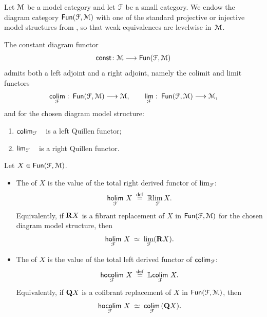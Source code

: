 \begin{definition}\label{ch2:: def: homotopy-(co)limits}
  Let $\mathcal M$ be a model category and let $\mathcal F$ be a small category.
  We endow the diagram category $\operatorname{{\sf Fun}}(\mathcal F,\mathcal M)$ with one of the standard
  projective or injective model structures from
  , so that weak equivalences are
  levelwise in~$\mathcal M$.

  The constant diagram functor
  \begin{equation}
    \operatorname{\sf const} \colon \mathcal M \longrightarrow \operatorname{{\sf Fun}}(\mathcal F,\mathcal M)
  \end{equation}
  admits both a left adjoint and a right adjoint, namely the colimit and
  limit functors
  \begin{equation}
    \Colimit[\cF] \colon \Fun(\cF,\cM) \longra \cM,
    \qquad
    \Limit[\cF] \colon \Fun(\cF,\cM) \longra \cM,
  \end{equation}
  and for the chosen diagram model structure:
  \begin{enumerate}
    \item $\Colimit[\cF]$ is a left Quillen functor;
    \item $\Limit[\cF]$ is a right Quillen functor.
  \end{enumerate}

  Let $X \in \operatorname{{\sf Fun}}(\mathcal F,\mathcal M)$.
  \begin{itemize}
    \item The  of $X$ is the value of the total
      right derived functor of $\lim_{\mathcal F}$:
      \begin{equation}
        \hoLimit[\cF] X
        \;\overset{\mathsf{def}}{=}\;
        \RR\!\lim_{\cF} X.
      \end{equation}
      Equivalently, if $\mathbf R X$ is a fibrant replacement of $X$
      in $\operatorname{{\sf Fun}}(\mathcal F,\mathcal M)$ for the chosen diagram model structure, then
      \begin{equation}
        \hoLimit[\cF] X
        \;\simeq\;
        \lim_{\cF} (\bR X).
      \end{equation}
    \item The  of $X$ is the value of the total
      left derived functor of $\operatorname{{\sf colim}}_{\mathcal F}$:
      \begin{equation}
        \hoColimit[\cF] X
        \;\overset{\mathsf{def}}{=}\;
        \LL\!\Colimit[\cF] X.
      \end{equation}
      Equivalently, if $\mathbf Q X$ is a cofibrant replacement of $X$
      in $\operatorname{{\sf Fun}}(\mathcal F,\mathcal M)$, then
      \begin{equation}
        \hoColimit[\cF] X
        \;\simeq\;
        \Colimit[\cF] (\bQ X).
      \end{equation}
  \end{itemize}
\end{definition}




